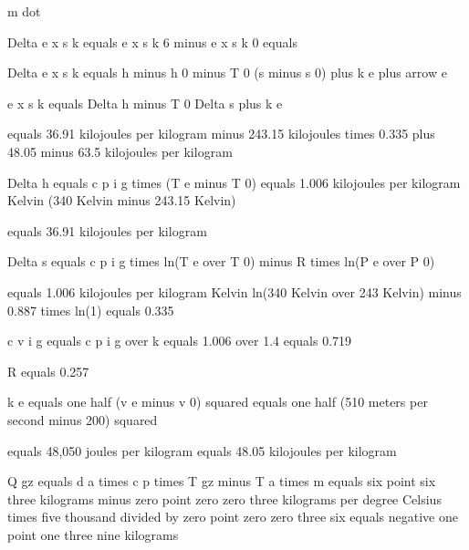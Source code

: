 m dot

Delta e x s k equals e x s k 6 minus e x s k 0 equals

Delta e x s k equals h minus h 0 minus T 0 (s minus s 0) plus k e plus arrow e

e x s k equals Delta h minus T 0 Delta s plus k e

equals 36.91 kilojoules per kilogram minus 243.15 kilojoules times 0.335 plus 48.05 minus 63.5 kilojoules per kilogram

Delta h equals c p i g times (T e minus T 0) equals 1.006 kilojoules per kilogram Kelvin (340 Kelvin minus 243.15 Kelvin)

equals 36.91 kilojoules per kilogram

Delta s equals c p i g times ln(T e over T 0) minus R times ln(P e over P 0)

equals 1.006 kilojoules per kilogram Kelvin ln(340 Kelvin over 243 Kelvin) minus 0.887 times ln(1) equals 0.335

c v i g equals c p i g over k equals 1.006 over 1.4 equals 0.719

R equals 0.257

k e equals one half (v e minus v 0) squared equals one half (510 meters per second minus 200) squared

equals 48,050 joules per kilogram equals 48.05 kilojoules per kilogram

Q gz equals d a times c p times T gz minus T a times m equals six point six three kilograms minus zero point zero zero three kilograms per degree Celsius times five thousand divided by zero point zero zero three six equals negative one point one three nine kilograms